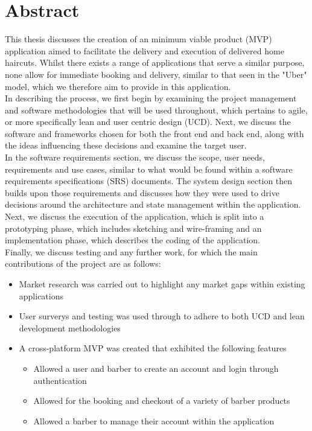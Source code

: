 \documentclass[12pt]{article}
\begin{document}
	\section*{Abstract}
	This thesis discusses the creation of an minimum viable product (MVP) application aimed to facilitate the delivery and execution of delivered home haircuts. Whilst there exists a range of applications that serve a similar purpose, none allow for immediate booking and delivery, similar to that seen in the "Uber" model, which we therefore aim to provide in this application.
	\\
	In describing the process, we first begin by examining the project management and software methodologies that will be used throughout, which pertains to agile, or more specifically lean and user centric design (UCD). Next, we discuss the software and frameworks chosen for both the front end and back end, along with the ideas influencing these decisions and examine the target user.
	\\
	In the software requirements section, we discuss the scope, user needs, requirements and use cases, similar to what would be found within a software requirements specifications (SRS) documents. The system design section then builds upon those requirements and discusses how they were used to drive decisions around the architecture and state management within the application.
	\\
	Next, we discuss the execution of the application, which is split into a prototyping phase, which includes sketching and wire-framing and an implementation phase, which describes the coding of the application.
	\\
	Finally, we discuss testing and any further work, for which the main contributions of the project are as follows:
	\begin{itemize}
		\item Market research was carried out to highlight any market gaps within existing applications
		\item User surverys and testing was used through to adhere to both UCD and lean development methodologies
		\item A cross-platform MVP was created that exhibited the following features
		\begin{itemize}
			\item Allowed a user and barber to create an account and login through authentication
			\item Allowed for the booking and checkout of a variety of barber products
			\item Allowed a barber to manage their account within the application
		\end{itemize}
	\end{itemize}
	
\end{document}
